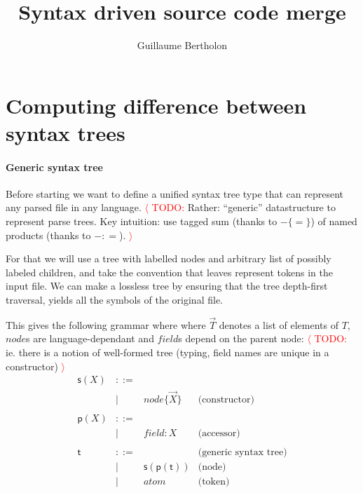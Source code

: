 \documentclass[a4paper,11pt]{article}
\title{Syntax driven source code merge}
\author{Guillaume Bertholon}
\renewcommand\vec[1]{\overrightarrow{#1}}
\begin{document}
\maketitle

\newcommand{\TODO}[1]{\textcolor{red}{$\langle$ TODO:} #1 \textcolor{red}{$\rangle$}}


\newcommand{\aNode}{\ensuremath{\mathit{node}}}
\newcommand{\aField}{\ensuremath{\mathit{field}}}
\newcommand{\aAtom}{\ensuremath{\mathit{atom}}}
\newcommand{\aTree}{\ensuremath{\mathsf{t}}}
\newcommand{\aSum}{\ensuremath{\mathsf{s}}}
\newcommand{\aProd}{\ensuremath{\mathsf{p}}}
\newcommand{\many}[1]{\ensuremath{\overrightarrow{#1}}}

\newcommand{\defNode}[2]{\ensuremath{#1 \{ #2 \}}}
\newcommand{\defField}[2]{\ensuremath{#1\!: #2}}



\section{Computing difference between syntax trees}

\paragraph{Generic syntax tree}
Before starting we want to define a unified syntax tree type that can
represent any parsed file in any language. \TODO{Rather: ``generic''
  datastructure to represent parse trees. Key intuition: use tagged
  sum (thanks to \defNode{-}{=}) of named products (thanks to
  \defField{-}{=}).}

For that we will use a tree with labelled
nodes and arbitrary list of possibly labeled children, and take the convention
that leaves represent tokens in the input file. We can make a lossless tree by
ensuring that the tree depth-first traversal, yields all the symbols of the
original file.

This gives the following grammar where where $\vec{T}$ denotes a list of
elements of $T$, $node$s are language-dependant and $field$s depend on the
parent node: \TODO{ie. there is a notion of well-formed tree (typing, field names are unique in a constructor)}
%
\[\begin{array}{lcll}
\aSum(X)  & ::= & & \\
          & |   & \defNode{\aNode}{\many{X}} & \text{(constructor)} \\
\\
\aProd(X) & ::= & & \\
          & |   & \defField{\aField}{X} & \text{(accessor)} \\
\\
\aTree & ::= & & \text{(generic syntax tree)} \\
       &  |  & \aSum(\aProd(\aTree)) & \text{(node)} \\
       &  |  & \aAtom & \text{(token)}
\end{array}\]
\end{document}
